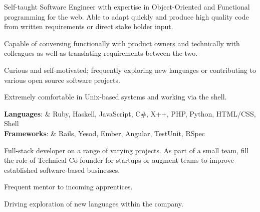 




     \selectfont

    \begin{resheader}{\name}{\email}{\addr}{\phone}
        Self-taught Software Engineer with expertise in Object-Oriented and
        Functional programming for the web. Able to adapt quickly and produce
        high quality code from written requirements or direct stake holder
        input.
    \end{resheader}


    \begin{reslist}
        \item{Capable of conversing functionally with product owners and
          technically with colleagues as well as translating requirements
          between the two.}
        \item{Curious and self-motivated; frequently exploring new languages or
          contributing to various open source software projects.}
        \item{Extremely comfortable in Unix-based systems and working via the
          shell.}
    \end{reslist}


    \begin{restable}
        {\bf Languages}:  & Ruby, Haskell, JavaScript, C\#, X++, PHP, Python,
                            HTML/CSS, Shell \\
        {\bf Frameworks}: & Rails, Yesod, Ember, Angular, TestUnit, RSpec \\
    \end{restable}



    Full-stack developer on a range of varying projects. As part of a small
    team, fill the role of Technical Co-founder for startups or augment teams to
    improve established software-based businesses.

    \begin{reslist}
      \item{Frequent mentor to incoming apprentices.}
      \item{Driving exploration of new languages within the company.}
    \end{reslist}

